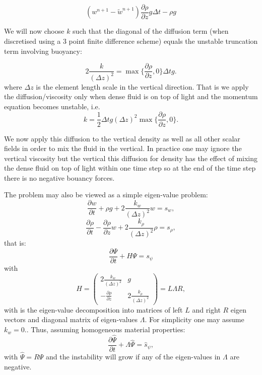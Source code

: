 \begin{equation}
(w^{n+1}-\tilde w^{n+1}) \frac{\partial \rho}{\partial z} g \Delta t -\rho g
\label{w-boy}
\end{equation}

We will now choose $k$ such that the diagonal of the diffusion
term (when discretised using a 3 point finite difference scheme)
equals the unstable truncation term involving buoyancy:

\begin{equation}
2\frac{k}{(\Delta z)^2} = \max{ \{ \frac{\partial \rho}{\partial z}, 0\} } \Delta t g.
\label{k-eqn}
\end{equation}
where $\Delta z$ is the element length scale in the vertical direction.
That is we apply the diffusion/viscosity only when dense fluid is on top of
light and the momentum equation becomes unstable, i.e.
\begin{equation}
k= \frac{1}{2}\Delta t g (\Delta z)^2 \max{ \{ \frac{\partial \rho}{\partial z}, 0\} }.
\label{k-value}
\end{equation}

We now apply this diffusion to the vertical density as well as
all other scalar fields in order to mix the fluid in the vertical.
In practice one may ignore the vertical viscosity but the vertical
this diffusion for density has the effect of mixing the dense fluid
on top of light within one time step so at the end of the time step
there is no negative bouancy forces.

The problem may also be viewed as a simple eigen-value problem:
\begin{equation}
\frac{\partial w}{\partial t} + \rho g + 2\frac{k_w}{(\Delta z)^2} w= s_w,
\label{w-e-prob}
\end{equation}
\begin{equation}
\frac{\partial \rho}{\partial t} -
\frac{\partial \rho}{\partial z} w + 2\frac{k_\rho}{(\Delta z)^2} \rho= s_\rho,
\label{rho-e-prob}
\end{equation}
that is:
\begin{equation}
\frac{\partial \Psi}{\partial t} + H \Psi = s_\psi
\label{w-rho-e-prob}
\end{equation}
with
\begin{equation}
H=  \begin{pmatrix}
   2\frac{k_w}{(\Delta z)^2}  &  g \\
-\frac{\partial \rho}{\partial z}   &  2\frac{k_\rho}{(\Delta z)^2}
\end{pmatrix}
= L \Lambda R,
\label{stab_matrix}
\end{equation}
with is the eigen-value decomposition into matrices
of left $L$ and right $R$ eigen vectors and
diagonal matrix of eigen-values $\Lambda$. For simplicity one may assume
$k_w=0.$.
Thus, assuming homogeneous material properties:
\begin{equation}
\frac{\partial \hat \Psi}{\partial t} + \Lambda \hat\Psi = \hat s_\psi,
\label{e-prob}
\end{equation}
with $\hat\Psi=R\Psi$ and the instability will grow if any of the
eigen-values in $\Lambda$ are negative.



